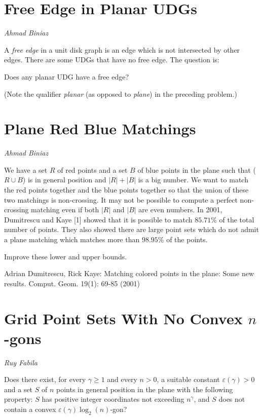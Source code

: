 \documentclass{patmorin}
\begin{document}
\section{Free Edge in Planar UDGs}

\noindent\emph{Ahmad Biniaz}

A \emph{free edge} in a unit disk graph is an edge which is not
intersected by other edges. There are some UDGs that have no free
edge. The question is:

\begin{op}
  Does any planar UDG have a free edge?
\end{op}

\noindent (Note the qualifier \emph{planar} (as opposed to \emph{plane}) in the
preceding problem.)


\section{Plane Red Blue Matchings}

\noindent\emph{Ahmad Biniaz}

We have a set $R$ of red points and a set $B$ of blue points in the plane such that ($R\cup B$) is in general position and $|R|+|B|$ is a big number. We want to match the red points together and the blue points together so that the union of these two matchings is non-crossing. It may not be possible to compute a perfect non-crossing matching even if both $|R|$ and $|B|$ are even numbers. In 2001, Dumitrescu and Kaye [1] showed that it is possible to match $85.71\%$ of the total number of points. They also showed there are large point sets which do not admit a plane matching which matches more than $98.95\%$ of the points. 

\begin{op}
  Improve these lower and upper bounds.
\end{op}

\noindent
Adrian Dumitrescu, Rick Kaye: Matching colored points in the plane: Some new results. Comput. Geom. 19(1): 69-85 (2001)

\section{Grid Point Sets With No Convex $n$-gons}

\noindent\emph{Ruy Fabila}

\begin{op}
  Does there exist, for every $\gamma \ge 1$ and every $n >0$, a suitable constant $\varepsilon(\gamma)>0$ and a set $S$
  of $n$ points in general position in the plane
  with the following property:
 $S$ has positive integer coordinates not exceeding $n^\gamma$, and $S$ does not contain a convex $\varepsilon(\gamma)\log_2(n)$-gon?
\end{op}
\end{document}

